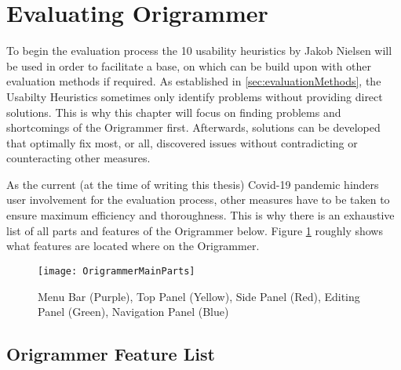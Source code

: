
\section{Evaluating Origrammer}
\label{sec:evaluation}

To begin the evaluation process the 10 usability heuristics by Jakob Nielsen \cite{10usability_heuristics} will be used in order to facilitate a base, on which can be build upon with other evaluation methods if required. As established in \ref{sec:evaluationMethods}, the Usabilty Heuristics sometimes only identify problems without providing direct solutions. This is why this chapter will focus on finding problems and shortcomings of the Origrammer first. Afterwards, solutions can be developed that optimally fix most, or all, discovered issues without contradicting or counteracting other measures.

As the current (at the time of writing this thesis) Covid-19 pandemic hinders user involvement for the evaluation process, other measures have to be taken to ensure maximum efficiency and thoroughness. This is why there is an exhaustive list of all parts and features of the Origrammer below. Figure \ref{fig:origrammerMain} roughly shows what features are located where on the Origrammer.

\begin{figure}[htbp]
	\centering
	\texttt{[image: OrigrammerMainParts]}
	\caption{Menu Bar (Purple), Top Panel (Yellow), Side Panel (Red), Editing Panel (Green), Navigation Panel (Blue)}
	\label{fig:origrammerMain}
\end{figure}

\subsection{Origrammer Feature List}
\label{sec:featureList}

